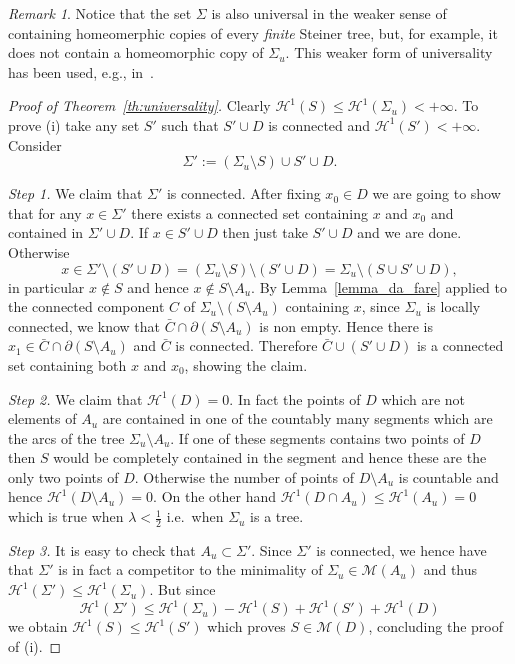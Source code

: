 \documentclass{amsart}
\renewcommand{\H}{\mathcal H}
\newcommand{\M}{\mathcal{M}}
\renewcommand{\H}{\mathcal{H}}
\theoremstyle{definition}
\theoremstyle{remark}
\newtheorem{remark}[theorem]{Remark}
\begin{document}
\begin{remark}
  Notice that the set $\Sigma$ is also universal in the weaker 
  sense of containing homeomerphic copies of every \emph{finite}
  Steiner tree, but, for example, it does not contain a 
  homeomorphic copy of $\Sigma_u$.
  This weaker form of universality has been used, e.g., 
  in~\cite{BasCheRasTep24}.
  \end{remark}
\begin{proof}[Proof of Theorem~\ref{th:universality}]
Clearly $\H^1(S)\le \H^1(\Sigma_u)<+\infty$.
To prove (i) take any set $S'$ such that $S'\cup D$ is connected 
and $\H^1(S')<+\infty$. 
Consider 
\[
  \Sigma' 
      := (\Sigma_u\setminus S) \cup S' \cup D.
\]

\emph{Step 1.} We claim that $\Sigma'$ is connected.
After fixing $x_0\in D$ we are going to show that for any $x\in \Sigma'$ there exists 
a connected set containing $x$ and $x_0$ and contained in $\Sigma'\cup D$.
If $x\in S'\cup D$ then just take $S'\cup D$ and we are done.
Otherwise 
\[
  x\in \Sigma'\setminus (S'\cup D) 
    = (\Sigma_u\setminus S)\setminus(S'\cup D)
    = \Sigma_u \setminus (S\cup S' \cup D),
\]
in particular $x\not\in S$ and hence $x\not \in S\setminus A_u$.
By Lemma~\ref{lemma_da_fare} applied to the connected component $C$ of 
$\Sigma_u\setminus(S\setminus A_u)$ containing $x$,
since $\Sigma_u$ is locally connected, we know that $\bar C\cap \partial (S\setminus A_u)$
is non empty. Hence there is $x_1\in \bar C \cap \partial (S\setminus A_u)$ and $\bar C$
is connected. Therefore $\bar C \cup (S'\cup D)$ is a connected set containing 
both $x$ and $x_0$, showing the claim.

\emph{Step 2.} 
We claim that $\H^1(D)=0$. 
In fact the points of $D$ which are not elements of $A_u$ are contained 
in one of the countably many segments which are the arcs of the tree $\Sigma_u\setminus A_u$.
If one of these segments contains two points of $D$ then $S$ would be completely contained 
in the segment and hence these are the only two points of $D$.
Otherwise the number of points of $D\setminus A_u$ is countable and hence $\H^1(D\setminus A_u)=0$.
On the other hand $\H^1(D\cap A_u)\le \H^1(A_u)=0$ which is true when $\lambda < \frac 1 2$
i.e.\ when $\Sigma_u$ is a tree.

\emph{Step 3.}
It is easy to check that $A_u\subset \Sigma'$. 
Since $\Sigma'$ is connected, we hence have that $\Sigma'$ is in fact 
a competitor to the minimality of $\Sigma_u\in \M(A_u)$ and thus $\H^1(\Sigma')\le \H^1(\Sigma_u)$.
But since 
\[
  \H^1(\Sigma') \le \H^1(\Sigma_u)-\H^1(S) + \H^1(S') + \H^1(D) 
\]
we obtain $\H^1(S)\le \H^1(S')$ 
which proves $S\in \M(D)$, concluding the proof of (i).


\end{proof}
\end{document}
